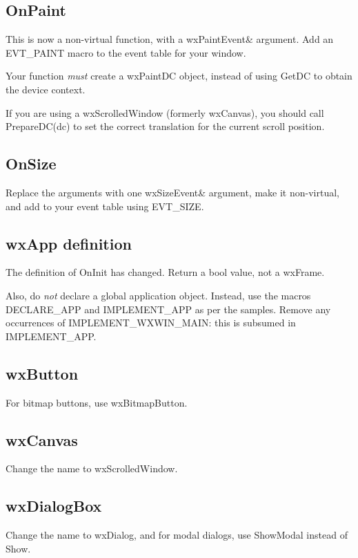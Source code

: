 \subsection{OnPaint}

This is now a non-virtual function, with a wxPaintEvent\& argument.
Add an EVT\_PAINT macro to the event table
for your window.

Your function {\it must} create a wxPaintDC object, instead of using GetDC to
obtain the device context.

If you are using a wxScrolledWindow (formerly wxCanvas), you should call
PrepareDC(dc) to set the correct translation for the current scroll position.

\subsection{OnSize}

Replace the arguments with one wxSizeEvent\& argument, make it non-virtual, and add to your
event table using EVT\_SIZE.

\subsection{wxApp definition}

The definition of OnInit has changed. Return a bool value, not a wxFrame.

Also, do {\it not} declare a global application object. Instead, use the macros
DECLARE\_APP and IMPLEMENT\_APP as per the samples. Remove any occurrences of IMPLEMENT\_WXWIN\_MAIN:
this is subsumed in IMPLEMENT\_APP.

\subsection{wxButton}

For bitmap buttons, use wxBitmapButton.

\subsection{wxCanvas}

Change the name to wxScrolledWindow.

\subsection{wxDialogBox}

Change the name to wxDialog, and for modal dialogs, use ShowModal instead of Show.

